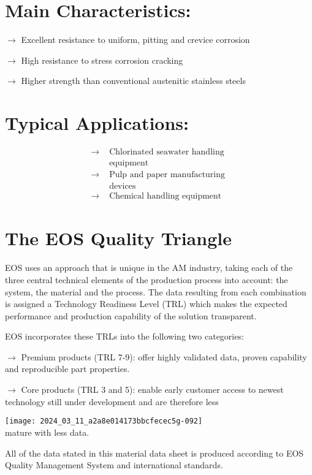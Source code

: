 \documentclass[10pt]{article}
\begin{document}
\section*{Main Characteristics:}
$\longrightarrow$ Excellent resistance to uniform, pitting and crevice corrosion

$\longrightarrow$ High resistance to stress corrosion cracking

$\longrightarrow$ Higher strength than conventional austenitic stainless steels

\section*{Typical Applications:}
$$
\begin{aligned}
\longrightarrow & \text { Chlorinated seawater handling } \\
& \text { equipment } \\
\longrightarrow & \text { Pulp and paper manufacturing } \\
& \text { devices } \\
\longrightarrow & \text { Chemical handling equipment }
\end{aligned}
$$

\section*{The EOS Quality Triangle}
EOS uses an approach that is unique in the AM industry, taking each of the three central technical elements of the production process into account: the system, the material and the process. The data resulting from each combination is assigned a Technology Readiness Level (TRL) which makes the expected performance and production capability of the solution transparent.

EOS incorporates these TRLs into the following two categories:

$\longrightarrow$ Premium products (TRL 7-9): offer highly validated data, proven capability and reproducible part properties.

$\longrightarrow$ Core products (TRL 3 and 5): enable early customer access to newest technology still under development and are therefore less

\texttt{[image: 2024\_03\_11\_a2a8e014173bbcfecec5g-092]}\\
mature with less data.

All of the data stated in this material data sheet is produced according to EOS Quality Management System and international standards.
\end{document}

